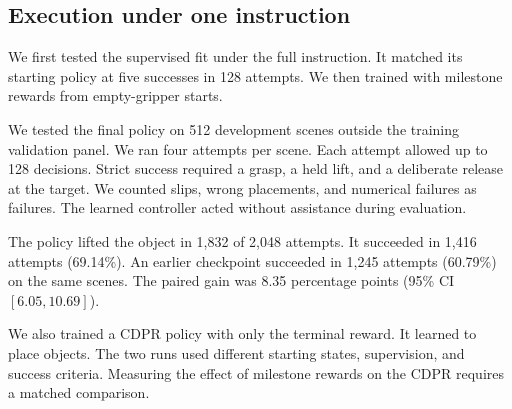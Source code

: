 \subsection{Execution under one instruction}\label{sec:cdpr_results}
We first tested the supervised fit under the full instruction. It matched its starting policy at five successes in 128 attempts. We then trained with milestone rewards from empty-gripper starts.

We tested the final policy on 512 development scenes outside the training validation panel. We ran four attempts per scene. Each attempt allowed up to 128 decisions. Strict success required a grasp, a held lift, and a deliberate release at the target. We counted slips, wrong placements, and numerical failures as failures. The learned controller acted without assistance during evaluation.



The policy lifted the object in 1,832 of 2,048 attempts. It succeeded in 1,416 attempts (69.14\%). An earlier checkpoint succeeded in 1,245 attempts (60.79\%) on the same scenes. The paired gain was 8.35 percentage points (95\% CI $[6.05,10.69]$).

We also trained a CDPR policy with only the terminal reward. It learned to place objects. The two runs used different starting states, supervision, and success criteria. Measuring the effect of milestone rewards on the CDPR requires a matched comparison.

